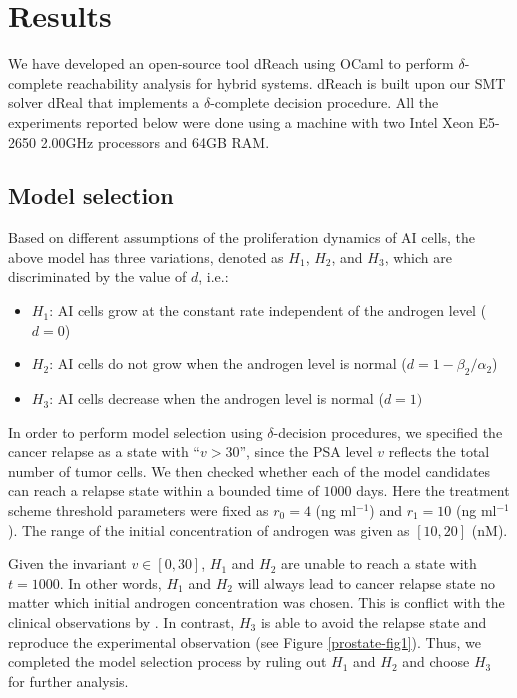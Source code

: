 \section{Results}\label{sec.results}

We have developed an open-source tool dReach using OCaml to perform $\delta$-complete reachability analysis for hybrid systems. dReach is built upon our SMT solver dReal \citep{dreal} that implements a $\delta$-complete decision procedure. All the experiments reported below were done using a machine with two Intel Xeon E5-2650 2.00GHz processors and 64GB RAM.


\subsection{Model selection}
Based on different assumptions of the proliferation dynamics of AI cells, the above model has three variations, denoted as $H_1$, $H_2$, and $H_3$, which are discriminated by the value of $d$, i.e.:
\begin{itemize}
\item $H_1$: AI cells grow at the constant rate independent of the androgen level ($d=0$)\\
\item $H_2$: AI cells do not grow when the androgen level is normal ($d=1-\beta_2/\alpha_2$)\\
\item $H_3$: AI cells decrease when the androgen level is normal ($d=1)$
\end{itemize}

In order to perform model selection using $\delta$-decision procedures, we specified the cancer relapse as a state with ``$v>30$'', since the PSA level $v$ reflects the total number of tumor cells. We then checked whether each of the model candidates can reach a relapse state within a bounded time of $1000$ days. Here the treatment scheme threshold parameters were fixed as $r_0=4$ (ng ml$^{-1}$) and $r_1=10$ (ng ml$^{-1}$). The range of the initial concentration of androgen was given as $[10, 20]$ (nM).

Given the invariant $v \in [0,30]$, $H_1$ and $H_2$ are unable to reach a state with $t=1000$. In other words, $H_1$ and $H_2$ will always lead to cancer relapse state no matter which initial androgen concentration was chosen. This is conflict with the clinical observations by \cite{bruchovsky06,bruchovsky07}. In contrast, $H_3$ is able to avoid the relapse state and reproduce the experimental observation (see Figure \ref{prostate-fig1}). Thus, we completed the model selection process by ruling out $H_1$ and $H_2$ and choose $H_3$ for further analysis.


